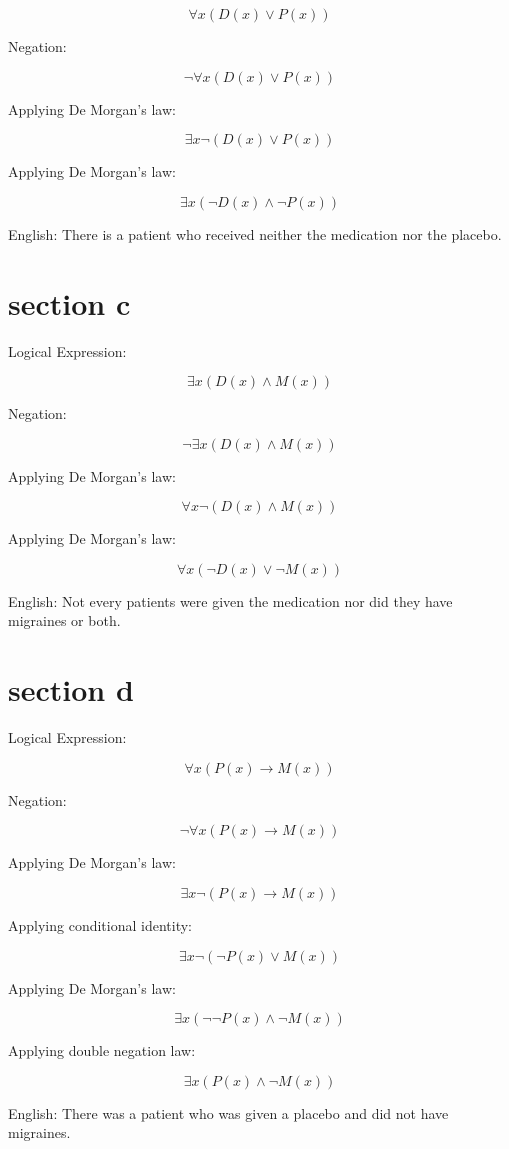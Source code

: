 \documentclass[10pt]{article}
\begin{document}
$$
\forall x(D(x) \vee P(x))
$$

Negation:

$$
\neg \forall x(D(x) \vee P(x))
$$

Applying De Morgan's law:

$$
\exists x \neg(D(x) \vee P(x))
$$

Applying De Morgan's law:

$$
\exists x(\neg D(x) \wedge \neg P(x))
$$

English: There is a patient who received neither the medication nor the placebo.

\section*{section c}
Logical Expression:

$$
\exists x(D(x) \wedge M(x))
$$

Negation:

$$
\neg \exists x(D(x) \wedge M(x))
$$

Applying De Morgan's law:

$$
\forall x \neg(D(x) \wedge M(x))
$$

Applying De Morgan's law:

$$
\forall x(\neg D(x) \vee \neg M(x))
$$

English: Not every patients were given the medication nor did they have migraines or both.

\section*{section d}
Logical Expression:

$$
\forall x(P(x) \rightarrow M(x))
$$

Negation:

$$
\neg \forall x(P(x) \rightarrow M(x))
$$

Applying De Morgan's law:

$$
\exists x \neg(P(x) \rightarrow M(x))
$$

Applying conditional identity:

$$
\exists x \neg(\neg P(x) \vee M(x))
$$

Applying De Morgan's law:

$$
\exists x(\neg \neg P(x) \wedge \neg M(x))
$$

Applying double negation law:

$$
\exists x(P(x) \wedge \neg M(x))
$$

English: There was a patient who was given a placebo and did not have migraines.
\end{document}

